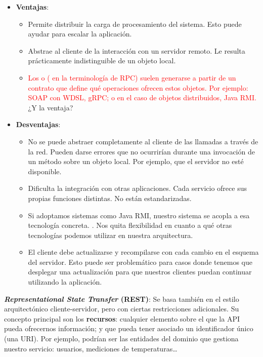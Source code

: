 \begin{itemize}
  \item \textbf{Ventajas}:
  \begin{itemize}
    \item Permite distribuir la carga de procesamiento del sistema. Esto puede ayudar para escalar la aplicación.

    \item Abstrae al cliente de la interacción con un servidor remoto. Le resulta prácticamente indistinguible de un objeto local.

    \item \textcolor{red}{Los  o ( en la terminología de RPC) suelen generarse a partir de un contrato que define qué operaciones ofrecen estos objetos. Por ejemplo: SOAP con WDSL, gRPC; o en el caso de objetos distribuidos, Java RMI.} ¿Y la ventaja?
  \end{itemize}

  \item \textbf{Desventajas}:
  \begin{itemize}
    \item No se puede abstraer completamente al cliente de las llamadas a través de la red. Pueden darse errores que no ocurrirían durante una invocación de un método sobre un objeto local. Por ejemplo, que el servidor no esté disponible. \cite{jausovecFallaciesDistributedSystems2020}

    \item Dificulta la integración con otras aplicaciones. Cada servicio ofrece sus propias funciones distintas. No están estandarizadas.

    \item Si adoptamos sistemas como Java RMI, nuestro sistema se acopla a esa tecnología concreta. \cite{newmanBuildingMicroservicesDesigning2021}. Nos quita flexibilidad en cuanto a qué otras tecnologías podemos utilizar en nuestra arquitectura.

    \item El cliente debe actualizarse y recompilarse con cada cambio en el esquema del servidor. Esto puede ser problemático para casos donde tenemos que desplegar una actualización para que nuestros clientes puedan continuar utilizando la aplicación.
  \end{itemize}
\end{itemize}

\textbf{\emph{Representational State Transfer} (REST)}: Se basa también en el estilo arquitectónico cliente-servidor, pero con ciertas restricciones adicionales. \cite{taylorSoftwareArchitectureFoundations2009} Su concepto principal son los \textbf{recursos}: cualquier elemento sobre el que la API pueda ofrecernos información; y que pueda tener asociado un identificador único (una URI). \cite{richardsonRESTfulWebServices2007} Por ejemplo, podrían ser las entidades del dominio que gestiona nuestro servicio: usuarios, mediciones de temperaturas\dots


